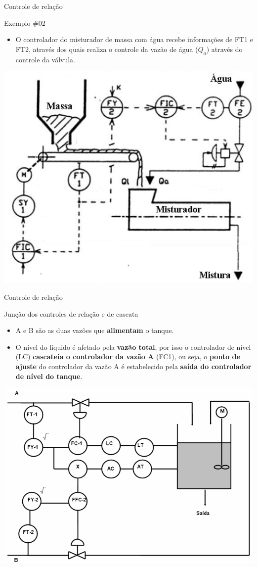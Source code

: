 \begin{frame}{Controle de relação}
	\begin{block}{Exemplo \#02}
		\begin{itemize}
			\item O controlador do misturador de massa com água recebe informações de FT1 e FT2, através dos quais realiza o controle da vazão de água ($ Q_a $) através do controle da válvula.
		\end{itemize}
	\end{block}

	\centering
	\includegraphics[width=0.5\linewidth]{Figuras/Ch15/fig8}
\end{frame}


\begin{frame}{Controle de relação}
	\begin{block}{Junção dos controles de relação e de cascata}
		\begin{itemize}
			\item A e B são as duas vazões que \textbf{alimentam} o tanque.
			\item O nível do liquido é afetado pela \textbf{vazão total}, por isso o controlador de nível (LC) \textbf{cascateia o controlador da vazão A} (FC1), ou seja, o \textbf{ponto de ajuste} do controlador da vazão A é estabelecido pela \textbf{saída do controlador de nível do tanque}.
		\end{itemize}
	\end{block}
	
	\centering
	\includegraphics[width=0.5\linewidth]{Figuras/Ch15/fig9}
\end{frame}


